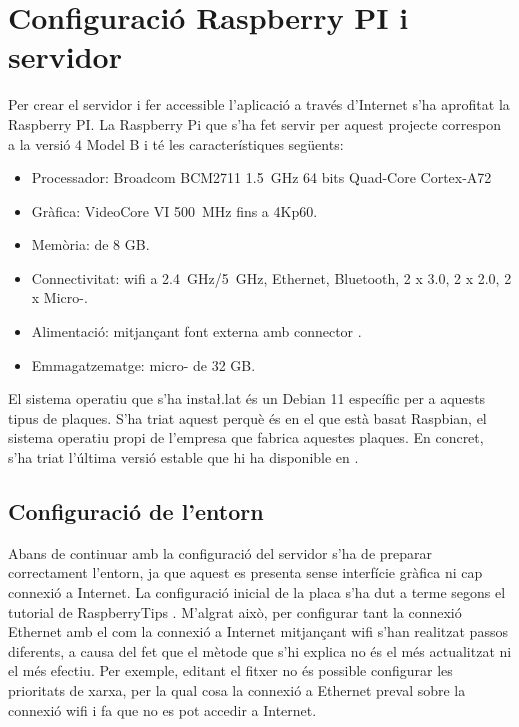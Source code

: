 \documentclass{tfgitic}[2022/06/30]
\begin{document}
\section{Configuració Raspberry PI i servidor}
Per crear el servidor i fer accessible l'aplicació a través d'Internet s'ha aprofitat la Raspberry PI. La Raspberry Pi que s'ha fet servir per aquest projecte correspon a la versió $4$ Model B i té les característiques següents: 

\begin{itemize}
    \item Processador: Broadcom BCM2711 \SI{1.5}{\GHz} 64 bits Quad-Core Cortex-A72
    \item Gràfica: VideoCore VI \SI{500}{\MHz} fins a 4Kp60.
    \item Memòria:  de 8 GB.
    \item Connectivitat: wifi a \SI{2.4}{\GHz}/\SI{5}{\GHz}, Ethernet, Bluetooth, 2 x  3.0, 2 x  2.0, 2 x Micro-.
    \item Alimentació: mitjançant font externa amb connector .
    \item Emmagatzematge: micro- de 32 GB.
\end{itemize}

El sistema operatiu que s'ha insta\l.lat és un Debian 11 específic per a aquests tipus de plaques. S'ha triat aquest  perquè és en el que està basat Raspbian, el sistema operatiu propi de l'empresa que fabrica aquestes plaques. En concret, s'ha triat l'última versió estable que hi ha disponible en \cite{debian}.

\subsection{Configuració de l'entorn}
Abans de continuar amb la configuració del servidor s'ha de preparar correctament l'entorn, ja que aquest es presenta sense interfície gràfica ni cap connexió a Internet. La configuració inicial de la placa s'ha dut a terme segons el tutorial de RaspberryTips \cite{debianInstall}. M'algrat això, per configurar tant la connexió Ethernet amb el  com la connexió a Internet mitjançant wifi s'han realitzat passos diferents, a causa del fet que el mètode que s'hi explica no és el més actualitzat ni el més efectiu. Per exemple, editant el fitxer  no és possible configurar les prioritats de xarxa, per la qual cosa la connexió a Ethernet preval sobre la connexió wifi i fa que no es pot accedir a Internet.
\end{document}

